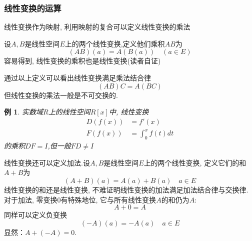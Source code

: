 \documentclass[a4paper,11pt]{article}
\theoremstyle{mystyle}
\newtheorem{example}{\hspace{2em}例}[section]
\begin{document}
\subsubsection*{线性变换的运算}
线性变换作为映射, 利用映射的复合可以定义线性变换的乘法
\begin{definition}
  设$A,B$是线性空间$E$上的两个线性变换,定义他们乘积$AB$为
  \begin{equation*}
    (AB)(a)=A(B(a))\quad (a\in E)
  \end{equation*}
  容易得到, 线性变换的乘积也是线性变换(读者自证)
\end{definition}
通过以上定义可以看出线性变换满足乘法结合律
\begin{equation*}
  (AB)C=A(BC)
\end{equation*}
但线性变换的乘法一般是不可交换的.
\begin{example}
  实数域$R$上的线性空间$R[x]$中, 线性变换
  \begin{equation*}
    \begin{split}
       D(f(x))&=f'(x)\\
       F(f(x))&=\int_{0}^{x}f(t)dt
    \end{split}
  \end{equation*}
  的乘积$DF=I$,但一般$FD\neq I$
\end{example}
线性变换还可以定义加法.设$A,B$是线性空间$E$上的两个线性变换, 定义它们的和$A+B$为
\begin{equation*}
  (A+B)(a)=A(a)+B(a)\quad a\in E
\end{equation*}
线性变换的和还是线性变换, 不难证明线性变换的加法满足加法结合律与交换律. 对于加法, 零变换$0$有特殊地位, 它与所有线性变换$A$的和仍为$A$:
\begin{equation*}
  A+0=A
\end{equation*}
同样可以定义负变换
\begin{equation*}
  (-A)(a)=-A(a)\quad a\in E
\end{equation*}
显然：$A+(-A)=0$.
\end{document}
